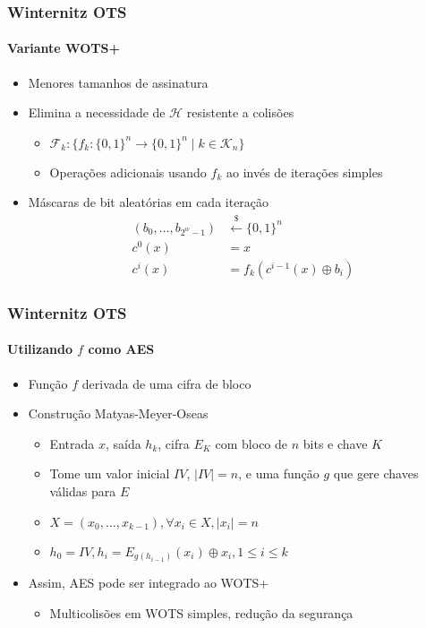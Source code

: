 \documentclass[12pt]{beamer}
\newcommand{\hh}{\mathcal{H}}
\newcommand{\binwds}[1]{\{0, 1\}^{#1}}
\newcommand{\length}[1]{\vert #1 \vert}
\begin{document}
\begin{frame}
  \frametitle{Winternitz OTS}
  \framesubtitle{Variante WOTS+}
  \begin{itemize}
    \item Menores tamanhos de assinatura
    \item Elimina a necessidade de $\hh{}$ resistente a colisões
    \begin{itemize}
      \item $\mathcal{F}_k : \{f_k : \binwds{n} \longrightarrow \binwds{n} \mid k \in \mathcal{K}_n\}$
      \item Operações adicionais usando $f_k$ ao invés de iterações simples
    \end{itemize}
    \item Máscaras de bit aleatórias em cada iteração
    \begin{align*}
      (b_0, \dots, b_{2^w - 1}) &\stackrel{\$}{\longleftarrow} \{0, 1\}^{n} \\
      c^0(x) &= x \\
      c^i(x) &= f_k(c^{i-1}(x) \oplus b_i)
    \end{align*}
  \end{itemize}
\end{frame}

\begin{frame}
  \frametitle{Winternitz OTS}
  \framesubtitle{Utilizando $f$ como AES}
  \begin{itemize}
      \item Função $f$ derivada de uma cifra de bloco
      \item Construção Matyas-Meyer-Oseas \cite[9.41]{Menezes:1996:HAC:548089}
      \begin{itemize}
        \item Entrada $x$, saída $h_k$, cifra $E_K$ com bloco de $n$ bits e chave $K$
        \item Tome um valor inicial $IV$, $\length{IV} = n$, e uma função $g$ que gere chaves válidas para $E$
        \item $X = (x_0, \dots, x_{k - 1}), \forall x_i \in X, \length{x_i} = n$
        \item $h_0 = IV, h_i = E_{g(h_{i-1})}(x_i) \oplus x_i, 1 \leq i \leq k$
      \end{itemize}
      \item Assim, AES pode ser integrado ao WOTS+
      \begin{itemize}
        \item Multicolisões em WOTS simples, redução da segurança
      \end{itemize}
  \end{itemize}
\end{frame}
\end{document}
